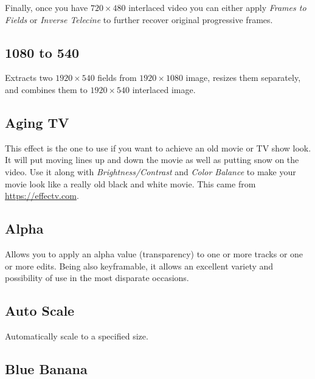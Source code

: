 Finally, once you have $720\times480$ interlaced video you can either apply \textit{Frames to Fields} or \textit{Inverse Telecine} to further recover original progressive frames.

\subsection{1080 to 540}%
\label{sub:1080_to_540}

Extracts two $1920\times540$ fields from $1920\times1080$ image, resizes them separately, and combines them to $1920\times540$ interlaced image.

\subsection{Aging TV}%
\label{sub:aging_tv}

This effect is the one to use if you want to achieve an old movie or TV show look. It will put moving lines up and down the movie as well as putting snow on the video. Use it along with \textit{Brightness/Contrast} and \textit{Color Balance} to make your movie look like a really old black and white movie. This came from \url{https://effectv.com}.

\subsection{Alpha}%
\label{sub:alpha}

Allows you to apply an alpha value (transparency) to one or more tracks or one or more edits. Being also keyframable, it allows an excellent variety and possibility of use in the most disparate occasions.

\subsection{Auto Scale}%
\label{sub:auto_scale}

Automatically scale to a specified size.

\subsection{Blue Banana}%
\label{sub:blue_banana}

